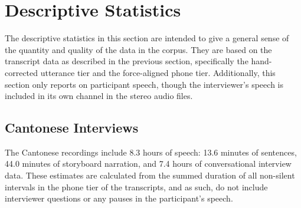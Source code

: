 \section{Descriptive Statistics}\label{ch2:sec:statistics}

The descriptive statistics in this section are intended to give a general sense of the quantity and quality of the data in the corpus. They are based on the transcript data as described in the previous section, specifically the hand-corrected utterance tier and the force-aligned phone tier. Additionally, this section only reports on participant speech, though the interviewer's speech is included in its own channel in the stereo audio files.

\subsection{Cantonese Interviews}\label{ch2:subsec:cantonese_descriptive}

The Cantonese recordings include 8.3 hours of speech: 13.6 minutes of sentences, 44.0 minutes of storyboard narration, and 7.4 hours of conversational interview data. These estimates are calculated from the summed duration of all non-silent intervals in the phone tier of the transcripts, and as such, do not include interviewer questions or any pauses in the participant's speech. 

